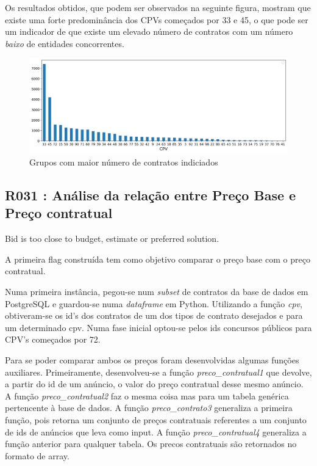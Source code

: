 Os resultados obtidos, que podem ser observados na seguinte figura, mostram que existe uma forte predominância dos CPVs começados por 33 e 45, o que pode ser um indicador de que existe um elevado número de contratos com um número \textit{baixo} de entidades concorrentes. 

\begin{figure}[H]
	\centering
	\includegraphics[width=\textwidth]{imagens/r019.png}
	\caption{Grupos com maior número de contratos indiciados}
	\label{}
\end{figure}





\subsection{R031 : Análise da relação entre Preço Base e Preço contratual}

{Bid is too close to budget, estimate or preferred solution.}




A primeira flag construída tem como objetivo comparar o preço base com o preço contratual.


Numa primeira instância, pegou-se num \textit{subset} de contratos da base de dados em PostgreSQL e guardou-se numa \textit{dataframe} em Python. 
Utilizando a função \textit{cpv}, obtiveram-se os id's dos contratos de um dos tipos de contrato desejados e para um determinado cpv. Numa fase inicial optou-se pelos ids concursos públicos para CPV's começados por 72. 


Para se poder comparar ambos os preços foram desenvolvidas algumas funções auxiliares.
Primeiramente, desenvolveu-se a função \textit{preco\_contratual1} que devolve, a partir do id de um anúncio, o valor do preço contratual desse mesmo anúncio.
A função \textit{preco\_contratual2} faz o mesma coisa mas para um tabela genérica pertencente à base de dados. A função \textit{preco\_contrato3} generaliza a primeira função, pois retorna um conjunto de preços contratuais referentes a um conjunto de ids de anúncios que leva como input. A função \textit{preco\_contratual4} generaliza a função anterior para qualquer tabela. Os precos contratuais são retornados no formato de array.


